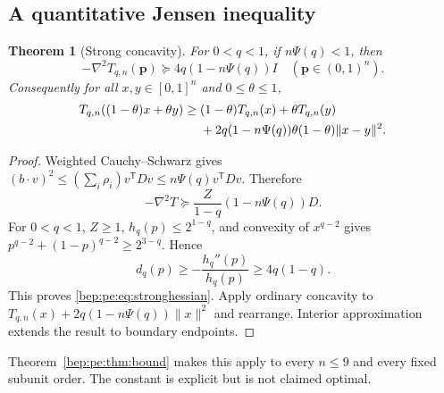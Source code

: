 \documentclass[11pt]{article}
\numberwithin{equation}{section}
\newtheorem{theorem}{Theorem}[section]
\theoremstyle{definition}
\theoremstyle{remark}
\newcommand{\p}{\boldsymbol p}
\begin{document}
\subsection{A quantitative Jensen inequality}
\begin{theorem}[Strong concavity]\label{bep:pe:thm:strong}
For $0<q<1$, if $n\Psi(q)<1$, then
\begin{equation}
 -\nabla^2T_{q,n}(\p)\succeq4q(1-n\Psi(q))I
 \quad(\p\in(0,1)^n).\label{bep:pe:eq:stronghessian}
\end{equation}
Consequently for all $x,y\in[0,1]^n$ and $0\leq\theta\leq1$,
\begin{align}
 T_{q,n}((1-\theta)x+\theta y)\geq{}&
 (1-\theta)T_{q,n}(x)+\theta T_{q,n}(y)\notag\\
 &+2q(1-n\Psi(q))\theta(1-\theta)\|x-y\|^2.
 \label{bep:pe:eq:strongjensen}
\end{align}
\end{theorem}
\begin{proof}
Weighted Cauchy--Schwarz gives
$(b\cdot v)^2\leq(\sum_i\rho_i)v^{\mathsf T}Dv
\leq n\Psi(q)v^{\mathsf T}Dv$. Therefore
\[
 -\nabla^2T\succeq\frac{Z}{1-q}(1-n\Psi(q))D.
\]
For $0<q<1$, $Z\geq1$, $h_q(p)\leq2^{1-q}$, and convexity of
$x^{q-2}$ gives
$p^{q-2}+(1-p)^{q-2}\geq2^{3-q}$. Hence
\[
 d_q(p)\geq-\frac{h_q''(p)}{h_q(p)}\geq4q(1-q).
\]
This proves \eqref{bep:pe:eq:stronghessian}. Apply ordinary concavity to
$T_{q,n}(x)+2q(1-n\Psi(q))\|x\|^2$ and rearrange. Interior approximation
extends the result to boundary endpoints.
\end{proof}
Theorem~\ref{bep:pe:thm:bound} makes this apply to every $n\leq9$ and every
fixed subunit order. The constant is explicit but is not claimed optimal.
\end{document}
